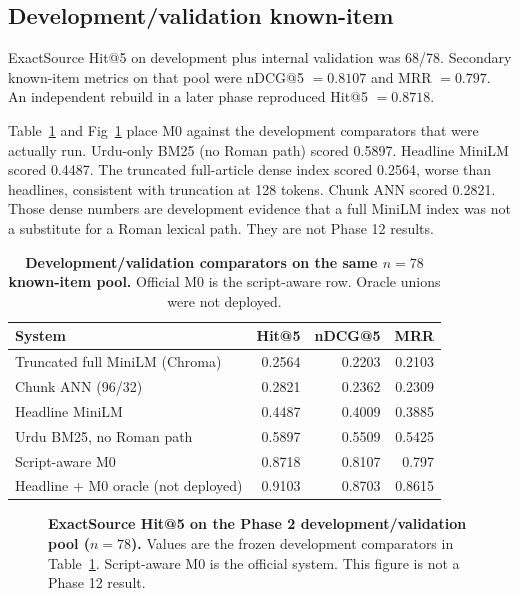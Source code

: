 \documentclass[10pt,letterpaper]{article}
\begin{document}
\subsection*{Development/validation known-item}

ExactSource Hit@5 on development plus internal validation was 68/78. Secondary known-item metrics on that pool were nDCG@5 $= 0.8107$ and MRR $= 0.797$. An independent rebuild in a later phase reproduced Hit@5 $= 0.8718$.

Table~\ref{table2} and Fig~\ref{fig2} place M0 against the development comparators that were actually run. Urdu-only BM25 (no Roman path) scored 0.5897. Headline MiniLM scored 0.4487. The truncated full-article dense index scored 0.2564, worse than headlines, consistent with truncation at 128 tokens. Chunk ANN scored 0.2821. Those dense numbers are development evidence that a full MiniLM index was not a substitute for a Roman lexical path. They are not Phase 12 results.

\begin{table}[!ht]
\centering
\caption{\textbf{Development/validation comparators on the same $n = 78$ known-item pool.} Official M0 is the script-aware row. Oracle unions were not deployed.}
\begin{tabular}{|l|r|r|r|}
\hline
\textbf{System} & \textbf{Hit@5} & \textbf{nDCG@5} & \textbf{MRR} \\
\hline
Truncated full MiniLM (Chroma) & 0.2564 & 0.2203 & 0.2103 \\
\hline
Chunk ANN (96/32) & 0.2821 & 0.2362 & 0.2309 \\
\hline
Headline MiniLM & 0.4487 & 0.4009 & 0.3885 \\
\hline
Urdu BM25, no Roman path & 0.5897 & 0.5509 & 0.5425 \\
\hline
Script-aware M0 & 0.8718 & 0.8107 & 0.797 \\
\hline
Headline + M0 oracle (not deployed) & 0.9103 & 0.8703 & 0.8615 \\
\hline
\end{tabular}
\label{table2}
\end{table}

\begin{figure}[!h]
\caption{\textbf{ExactSource Hit@5 on the Phase 2 development/validation pool ($n = 78$).} Values are the frozen development comparators in Table~\ref{table2}. Script-aware M0 is the official system. This figure is not a Phase 12 result.}
\label{fig2}
\end{figure}
\end{document}
